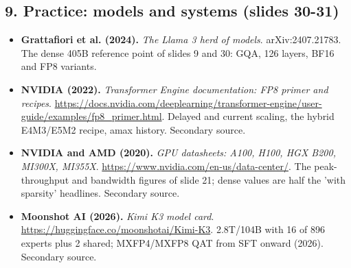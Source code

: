 \documentclass[11pt,letterpaper]{article}
\begin{document}
\subsection*{9. Practice: models and systems (slides 30-31)}
\begin{itemize}[leftmargin=1.2em,itemsep=3pt]\sloppy
\item \textbf{Grattafiori et al. (2024).} \textit{The Llama 3 herd of models}. arXiv:2407.21783. The dense 405B reference point of slides 9 and 30: GQA, 126 layers, BF16 and FP8 variants.
\item \textbf{NVIDIA (2022).} \textit{Transformer Engine documentation: FP8 primer and recipes}. \url{https://docs.nvidia.com/deeplearning/transformer-engine/user-guide/examples/fp8_primer.html}. Delayed and current scaling, the hybrid E4M3/E5M2 recipe, amax history. Secondary source.
\item \textbf{NVIDIA and AMD (2020).} \textit{GPU datasheets: A100, H100, HGX B200, MI300X, MI355X}. \url{https://www.nvidia.com/en-us/data-center/}. The peak-throughput and bandwidth figures of slide 21; dense values are half the 'with sparsity' headlines. Secondary source.
\item \textbf{Moonshot AI (2026).} \textit{Kimi K3 model card}. \url{https://huggingface.co/moonshotai/Kimi-K3}. 2.8T/104B with 16 of 896 experts plus 2 shared; MXFP4/MXFP8 QAT from SFT onward (2026). Secondary source.
\end{itemize}
\clearpage
\printindex
\end{document}
